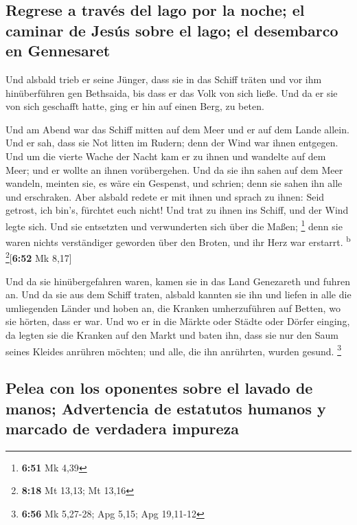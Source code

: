 \hypertarget{regrese-a-travuxe9s-del-lago-por-la-noche-el-caminar-de-jesuxfas-sobre-el-lago-el-desembarco-en-gennesaret}{%
\subsection{Regrese a través del lago por la noche; el caminar de Jesús
sobre el lago; el desembarco en
Gennesaret}\label{regrese-a-travuxe9s-del-lago-por-la-noche-el-caminar-de-jesuxfas-sobre-el-lago-el-desembarco-en-gennesaret}}

 Und alsbald trieb er seine Jünger, dass sie in das
Schiff träten und vor ihm hinüberführen gen Bethsaida, bis dass er das
Volk von sich ließe.  Und da er sie von sich geschafft
hatte, ging er hin auf einen Berg, zu beten.

 Und am Abend war das Schiff mitten auf dem Meer und er
auf dem Lande allein.  Und er sah, dass sie Not litten im
Rudern; denn der Wind war ihnen entgegen. Und um die vierte Wache der
Nacht kam er zu ihnen und wandelte auf dem Meer;  und er
wollte an ihnen vorübergehen. Und da sie ihn sahen auf dem Meer wandeln,
meinten sie, es wäre ein Gespenst, und schrien;  denn sie
sahen ihn alle und erschraken. Aber alsbald redete er mit ihnen und
sprach zu ihnen: Seid getrost, ich bin's, fürchtet euch nicht!
 Und trat zu ihnen ins Schiff, und der Wind legte sich.
Und sie entsetzten und verwunderten sich über die Maßen; \footnote{\textbf{6:51}
  Mk 4,39}  denn sie waren nichts verständiger geworden
über den Broten, und ihr Herz war erstarrt. \textsuperscript{b}
\footnote{\textbf{8:18} Mt 13,13; Mt 13,16}{[}\textbf{6:52} Mk 8,17{]}

 Und da sie hinübergefahren waren, kamen sie in das Land
Genezareth und fuhren an.  Und da sie aus dem Schiff
traten, alsbald kannten sie ihn  und liefen in alle die
umliegenden Länder und hoben an, die Kranken umherzuführen auf Betten,
wo sie hörten, dass er war.  Und wo er in die Märkte oder
Städte oder Dörfer einging, da legten sie die Kranken auf den Markt und
baten ihn, dass sie nur den Saum seines Kleides anrühren möchten; und
alle, die ihn anrührten, wurden gesund. \footnote{\textbf{6:56} Mk
  5,27-28; Apg 5,15; Apg 19,11-12}

\hypertarget{pelea-con-los-oponentes-sobre-el-lavado-de-manos-advertencia-de-estatutos-humanos-y-marcado-de-verdadera-impureza}{%
\subsection{Pelea con los oponentes sobre el lavado de manos;
Advertencia de estatutos humanos y marcado de verdadera
impureza}\label{pelea-con-los-oponentes-sobre-el-lavado-de-manos-advertencia-de-estatutos-humanos-y-marcado-de-verdadera-impureza}}

